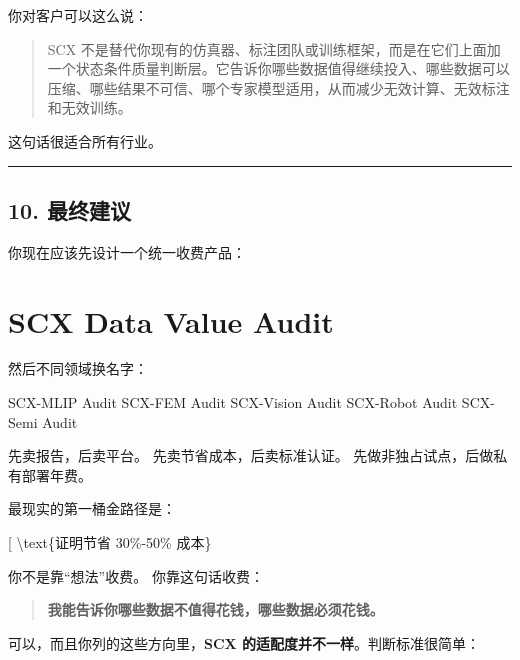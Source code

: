 \documentclass[
  12pt,
]{ctexart}
\newenvironment{Shaded}{}{}
\newcommand{\NormalTok}[1]{#1}
\begin{document}
你对客户可以这么说：

\begin{quote}
SCX
不是替代你现有的仿真器、标注团队或训练框架，而是在它们上面加一个状态条件质量判断层。它告诉你哪些数据值得继续投入、哪些数据可以压缩、哪些结果不可信、哪个专家模型适用，从而减少无效计算、无效标注和无效训练。
\end{quote}

这句话很适合所有行业。

\begin{center}\rule{0.5\linewidth}{0.5pt}\end{center}

\subsection{10. 最终建议}\label{ux6700ux7ec8ux5efaux8bae}

你现在应该先设计一个统一收费产品：

\section{\texorpdfstring{\textbf{SCX Data Value
Audit}}{SCX Data Value Audit}}\label{scx-data-value-audit}

然后不同领域换名字：

\begin{Shaded}
\begin{Highlighting}[]
\NormalTok{SCX{-}MLIP Audit}
\NormalTok{SCX{-}FEM Audit}
\NormalTok{SCX{-}Vision Audit}
\NormalTok{SCX{-}Robot Audit}
\NormalTok{SCX{-}Semi Audit}
\end{Highlighting}
\end{Shaded}

先卖报告，后卖平台。 先卖节省成本，后卖标准认证。
先做非独占试点，后做私有部署年费。

最现实的第一桶金路径是：

{[}  \rightarrow {}
\rightarrow \textbackslash text\{证明节省 30\%-50\% 成本\} \rightarrow
{} \rightarrow \text{私有部署年费}{]}

你不是靠``想法''收费。 你靠这句话收费：

\begin{quote}
\textbf{我能告诉你哪些数据不值得花钱，哪些数据必须花钱。}
\end{quote}

可以，而且你列的这些方向里，\textbf{SCX
的适配度并不一样}。判断标准很简单：
\end{document}
